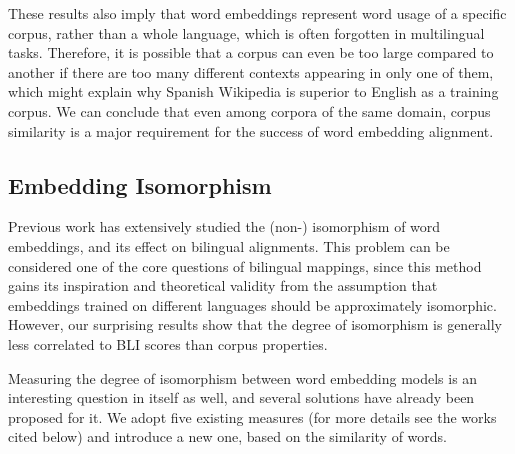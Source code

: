 \documentclass[11pt]{article}
\begin{document}
    These results also imply that word embeddings represent word usage of a specific corpus, rather than a whole language, which is often forgotten in multilingual tasks. Therefore, it is possible that a corpus can even be too large compared to another if there are too many different contexts appearing in only one of them, which might explain why Spanish Wikipedia is superior to English as a training corpus. We can conclude that even among corpora of the same domain, corpus similarity is a major requirement for the success of word embedding alignment. 
    

\subsection{Embedding Isomorphism}

    Previous work has extensively studied the (non-) isomorphism of word embeddings, and its effect on bilingual alignments. This problem can be considered one of the core questions of bilingual mappings, since this method gains its inspiration and theoretical validity from the assumption that embeddings trained on different languages should be approximately isomorphic. However, our surprising results show that the degree of isomorphism is generally less correlated to BLI scores than corpus properties.

    Measuring the degree of isomorphism between word embedding models is an interesting question in itself as well, and several solutions have already been proposed for it. We adopt five existing measures (for more details see the works cited below) and introduce a new one, based on the similarity of words.
    
    \begin{table}[htbp]
        \centering
        \caption{Pearson correlation coefficients between P@1 scores and isomorphism.}
        \label{tab:isomorph}
    \end{table}
    
\end{document}
